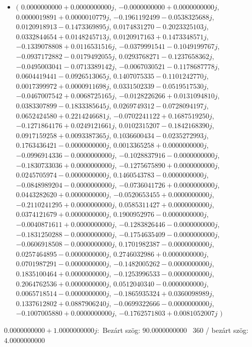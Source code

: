 \documentclass[14pt,a4paper]{article}
\begin{document}
\begin{itemize}
\item
$\big($
$0.0000000000+0.0000000000j$, $-0.0000000000+0.0000000000j$, $0.0000019891+0.0000010779j$, $-0.1961192499-0.0538325688j$, $0.0120918913-0.1473369895j$, $0.0174831270-0.2023325103j$, $0.0332844654+0.0148245713j$, $0.0120917163+0.1473348571j$, $-0.1339078808+0.0116531516j$, $-0.0379991541-0.1049199767j$, $-0.0937172882-0.0179492055j$, $0.0293768271-0.1237658362j$, $-0.0495003041-0.0713389142j$, $-0.0067030521-0.1178687778j$, $0.0604419441-0.0926513065j$, $0.1407075335-0.1101242770j$, $0.0017399972+0.0000911698j$, $0.0331502339-0.0519517530j$, $-0.0467007542+0.0068725165j$, $-0.0128226266+0.0131094810j$, $0.0383307899-0.1833385645j$, $0.0269749312-0.0728094197j$, $0.0652424580+0.2214246681j$, $-0.0702241122+0.1687519250j$, $-0.1271864176+0.0249121661j$, $0.0102315207-0.1842168390j$, $0.0917159258+0.0093387365j$, $0.1036600434-0.0235272993j$, $0.1763436421-0.0000000000j$, $0.0013365258+0.0000000000j$, $-0.0996914336-0.0000000000j$, $-0.1028837916-0.0000000000j$, $-0.1830733036+0.0000000000j$, $-0.1275675890+0.0000000000j$, $0.0245705974-0.0000000000j$, $0.1460543783-0.0000000000j$, $-0.0848989204-0.0000000000j$, $-0.0736041726+0.0000000000j$, $0.0443282620+0.0000000000j$, $-0.0520653455+0.0000000000j$, $-0.2110241295+0.0000000000j$, $0.0585311427+0.0000000000j$, $0.0374121679+0.0000000000j$, $0.1900952976-0.0000000000j$, $-0.0040871611+0.0000000000j$, $-0.1283826446-0.0000000000j$, $-0.1831250288-0.0000000000j$, $-0.1754635409-0.0000000000j$, $-0.0606918508-0.0000000000j$, $0.1701982387-0.0000000000j$, $0.0257464895-0.0000000000j$, $0.2746032986+0.0000000000j$, $0.0701987291-0.0000000000j$, $-0.1482005262-0.0000000000j$, $0.1835100464+0.0000000000j$, $-0.1253996533-0.0000000000j$, $0.2064762536+0.0000000000j$, $0.0512040340-0.0000000000j$, $0.0065718514-0.0000000000j$, $-0.1865935324+0.0360098989j$, $0.1337612802+0.0887906240j$, $-0.0699322666-0.0000000000j$, $-0.1007005880+0.0000000000j$, $-0.1762571803+0.0081052007j$
$\big)$
\end{itemize}
$0.0000000000+1.0000000000j$:\
Bezárt szög: $90.0000000000$ \
360 / bezárt szög: $4.0000000000$\
\end{document}

